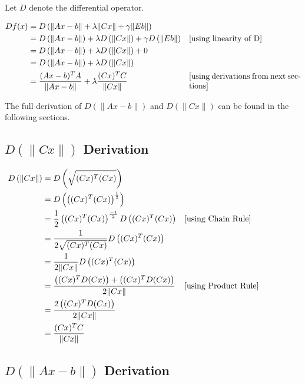 \documentclass{article}
\begin{document}
    Let $D$ denote the differential operator.

    \begin{align*}
    Df(x) &= D \left( \| Ax - b \| + \lambda \| Cx \| + \gamma \| Eb \| \right) &\\
    &= D \left( \| Ax - b \| \right) +  \lambda D \left( \| Cx \| \right) +  \gamma D \left( \| Eb \| \right) & \parbox[c]{0.4\linewidth}{[using linearity of D]}\\
    &= D \left( \| Ax - b \| \right) +  \lambda D \left( \| Cx \| \right) +  0 &\\
    &= D \left( \| Ax - b \| \right) +  \lambda D \left( \| Cx \| \right) &\\
    &= \frac{ (Ax-b)^T A }{\| Ax-b \| } + \lambda \frac{(Cx)^T C}{ \| Cx \| } & \parbox[c]{0.4\linewidth}{[using derivations from next sections]}
    \end{align*}

    The full derivation of $D \left( \| Ax - b \| \right)$ and $ D \left( \| Cx \| \right) $ can be found in the following sections.

    \subsection{ $D \left(\| Cx \| \right)$ Derivation }

    \begin{align*}
        D\left( \| Cx \| \right) &= D \left( \sqrt{(Cx)^T (Cx)} \right) \\
        &= D \left( \left( (Cx)^T (Cx) \right)^\frac{1}{2} \right) \\
        &= \frac{1}{2} \left( (Cx)^T (Cx) \right)^\frac{-1}{2} D \left( (Cx)^T (Cx) \right) & \parbox[c]{0.4\linewidth}{[using Chain Rule]}\\
        &= \frac{1}{2 \sqrt{ (Cx)^T (Cx) } }  D \left( (Cx)^T (Cx) \right) \\
        &= \frac{1}{2 \| Cx \| }  D \left( (Cx)^T (Cx) \right) \\
        &= \frac{\left( (Cx)^T D(Cx) \right) + \left( (Cx)^T D(Cx) \right) }{2 \| Cx \| } & \parbox[c]{0.4\linewidth}{[using Product Rule]}\\
        &= \frac{2 \left( (Cx)^T D(Cx) \right)}{2 \| Cx \| } \\
        &= \frac{(Cx)^T C}{ \| Cx \| }
    \end{align*}

    \subsection{ $D \left( \| Ax-b \| \right)$ Derivation}
\end{document}
